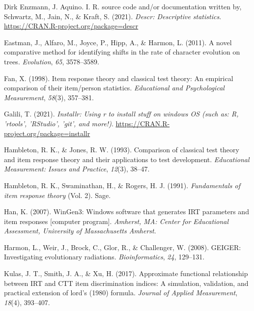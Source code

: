 \documentclass[
  man]{apa6}
\newlength{\cslhangindent}
\newlength{\cslentryspacingunit} %
\newenvironment{CSLReferences}[2] %
 {%
  \setlength{\parindent}{0pt}
  \ifodd #1
  \let\oldpar\par
  \def\par{\hangindent=\cslhangindent\oldpar}
  \fi
  \setlength{\parskip}{#2\cslentryspacingunit}
 }%
 {}
\begin{document}
\begin{CSLReferences}{1}{0}
\leavevmode{}%
Dirk Enzmann, J. Aquino. I. R. source code and/or documentation written by, Schwartz, M., Jain, N., \& Kraft, S. (2021). \emph{Descr: Descriptive statistics}. \url{https://CRAN.R-project.org/package=descr}

\leavevmode{}%
Eastman, J., Alfaro, M., Joyce, P., Hipp, A., \& Harmon, L. (2011). A novel comparative method for identifying shifts in the rate of character evolution on trees. \emph{Evolution}, \emph{65}, 3578--3589.

\leavevmode{}%
Fan, X. (1998). Item response theory and classical test theory: An empirical comparison of their item/person statistics. \emph{Educational and Psychological Measurement}, \emph{58}(3), 357--381.

\leavevmode{}%
Galili, T. (2021). \emph{Installr: Using r to install stuff on windows OS (such as: R, 'rtools', 'RStudio', 'git', and more!)}. \url{https://CRAN.R-project.org/package=installr}

\leavevmode{}%
Hambleton, R. K., \& Jones, R. W. (1993). Comparison of classical test theory and item response theory and their applications to test development. \emph{Educational Measurement: Issues and Practice}, \emph{12}(3), 38--47.

\leavevmode{}%
Hambleton, R. K., Swaminathan, H., \& Rogers, H. J. (1991). \emph{Fundamentals of item response theory} (Vol. 2). Sage.

\leavevmode{}%
Han, K. (2007). WinGen3: Windows software that generates IRT parameters and item responses {[}computer program{]}. \emph{Amherst, MA: Center for Educational Assessment, University of Massachusetts Amherst}.

\leavevmode{}%
Harmon, L., Weir, J., Brock, C., Glor, R., \& Challenger, W. (2008). GEIGER: Investigating evolutionary radiations. \emph{Bioinformatics}, \emph{24}, 129--131.

\leavevmode{}%
Kulas, J. T., Smith, J. A., \& Xu, H. (2017). Approximate functional relationship between IRT and CTT item discrimination indices: A simulation, validation, and practical extension of lord's (1980) formula. \emph{Journal of Applied Measurement}, \emph{18}(4), 393--407.


\end{CSLReferences}
\end{document}
